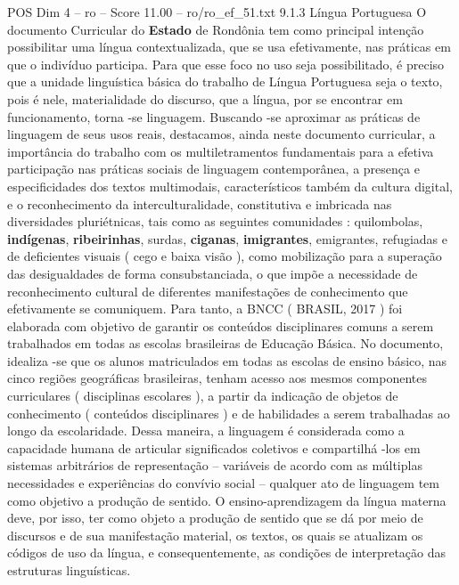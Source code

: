 \begin{textsample}{POS Dim 4 – ro – Score 11.00 – ro/ro\_ef\_51.txt}  \label{ex:f4_pos_213}
9.1.3 Língua Portuguesa O documento Curricular do \textbf{Estado} de Rondônia tem como principal intenção possibilitar uma língua contextualizada, que se usa efetivamente, nas práticas em que o indivíduo participa.
Para que esse foco no uso seja possibilitado, é preciso que a unidade linguística básica do trabalho de Língua Portuguesa seja o texto, pois é nele, materialidade do discurso, que a língua, por se encontrar em funcionamento, torna -se linguagem.
Buscando -se aproximar as práticas de linguagem de seus usos reais, destacamos, ainda neste documento curricular, a importância do trabalho com os multiletramentos fundamentais para a efetiva participação nas práticas sociais de linguagem contemporânea, a presença e especificidades dos textos multimodais, característicos também da cultura digital, e o reconhecimento da interculturalidade, constitutiva e imbricada nas diversidades pluriétnicas, tais como as seguintes comunidades : quilombolas, \textbf{indígenas}, \textbf{ribeirinhas}, surdas, \textbf{ciganas}, \textbf{imigrantes}, emigrantes, refugiadas e de deficientes visuais ( cego e baixa visão ), como mobilização para a superação das desigualdades de forma consubstanciada, o que impõe a necessidade de reconhecimento cultural de diferentes manifestações de conhecimento que efetivamente se comuniquem.
Para tanto, a BNCC ( BRASIL, 2017 ) foi elaborada com objetivo de garantir os conteúdos disciplinares comuns a serem trabalhados em todas as escolas brasileiras de Educação Básica.
No documento, idealiza -se que os alunos matriculados em todas as escolas de ensino básico, nas cinco regiões geográficas brasileiras, tenham acesso aos mesmos componentes curriculares ( disciplinas escolares ), a partir da indicação de objetos de conhecimento ( conteúdos disciplinares ) e de habilidades a serem trabalhadas ao longo da escolaridade.
Dessa maneira, a linguagem é considerada como a capacidade humana de articular significados coletivos e compartilhá -los em sistemas arbitrários de representação – variáveis de acordo com as múltiplas necessidades e experiências do convívio social – qualquer ato de linguagem tem como objetivo a produção de sentido.
O ensino-aprendizagem da língua materna deve, por isso, ter como objeto a produção de sentido que se dá por meio de discursos e de sua manifestação material, os textos, os quais se atualizam os códigos de uso da língua, e consequentemente, as condições de interpretação das estruturas linguísticas.

\end{textsample}
